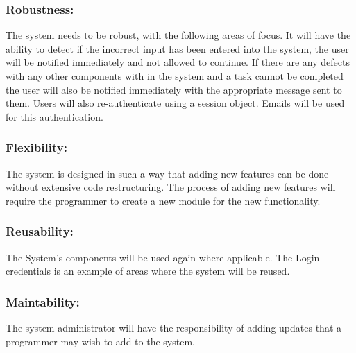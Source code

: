 \vspace{0.2in}

\subsubsection{Robustness:}

\begin{flushleft}

The system needs to be robust, with the following areas of focus. It will have the ability to detect if the incorrect input has been entered into the system, the user will be notified immediately and not allowed to continue. If there are any defects with any other components with in the system and a task cannot be completed the user will also be notified immediately with the appropriate message sent to them. Users will also re-authenticate using a session object. Emails will be used for this authentication.
\end{flushleft}

\vspace{0.1in}

\vspace{0.2in}

\subsubsection{Flexibility:}

\begin{flushleft}

The system is designed in such a way that adding new features can be done without extensive code restructuring. The process of adding new features will require the programmer to create a new module for the new functionality.

\end{flushleft}

\vspace{0.1in}

\vspace{0.2in}

\subsubsection{Reusability:}

\begin{flushleft}

The System's components will be used again where applicable. The Login credentials is an example of areas where the system will be reused.

\end{flushleft}

\vspace{0.1in}

\vspace{0.2in}

\subsubsection{Maintability:}

\begin{flushleft}
The system administrator will have the responsibility of adding updates that a programmer may wish to add to the system. 

\end{flushleft}

\vspace{0.1in}